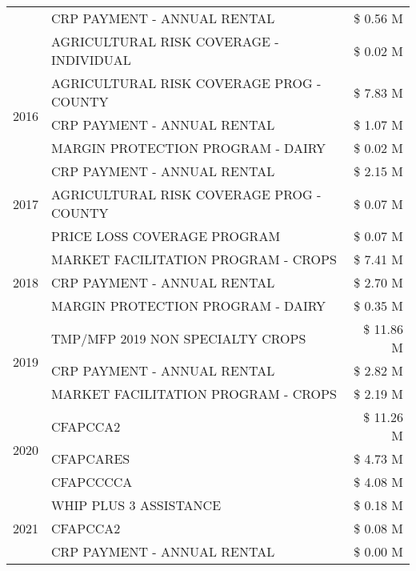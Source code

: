 \begin{tabular}{llr}
 & CRP PAYMENT - ANNUAL RENTAL & \$ 0.56 M \\
 & AGRICULTURAL RISK COVERAGE - INDIVIDUAL & \$ 0.02 M \\
\cline{1-3}
\multirow[t]{3}{*}{2016} & AGRICULTURAL RISK COVERAGE PROG - COUNTY & \$ 7.83 M \\
 & CRP PAYMENT - ANNUAL RENTAL & \$ 1.07 M \\
 & MARGIN PROTECTION PROGRAM - DAIRY & \$ 0.02 M \\
\cline{1-3}
\multirow[t]{3}{*}{2017} & CRP PAYMENT - ANNUAL RENTAL & \$ 2.15 M \\
 & AGRICULTURAL RISK COVERAGE PROG - COUNTY & \$ 0.07 M \\
 & PRICE LOSS COVERAGE PROGRAM & \$ 0.07 M \\
\cline{1-3}
\multirow[t]{3}{*}{2018} & MARKET FACILITATION PROGRAM - CROPS & \$ 7.41 M \\
 & CRP PAYMENT - ANNUAL RENTAL & \$ 2.70 M \\
 & MARGIN PROTECTION PROGRAM - DAIRY & \$ 0.35 M \\
\cline{1-3}
\multirow[t]{3}{*}{2019} & TMP/MFP 2019 NON SPECIALTY CROPS & \$ 11.86 M \\
 & CRP PAYMENT - ANNUAL RENTAL & \$ 2.82 M \\
 & MARKET FACILITATION PROGRAM - CROPS & \$ 2.19 M \\
\cline{1-3}
\multirow[t]{3}{*}{2020} & CFAPCCA2 & \$ 11.26 M \\
 & CFAPCARES & \$ 4.73 M \\
 & CFAPCCCCA & \$ 4.08 M \\
\cline{1-3}
\multirow[t]{3}{*}{2021} & WHIP PLUS 3 ASSISTANCE & \$ 0.18 M \\
 & CFAPCCA2 & \$ 0.08 M \\
 & CRP PAYMENT - ANNUAL RENTAL & \$ 0.00 M \\
\cline{1-3}
\bottomrule
\end{tabular}
